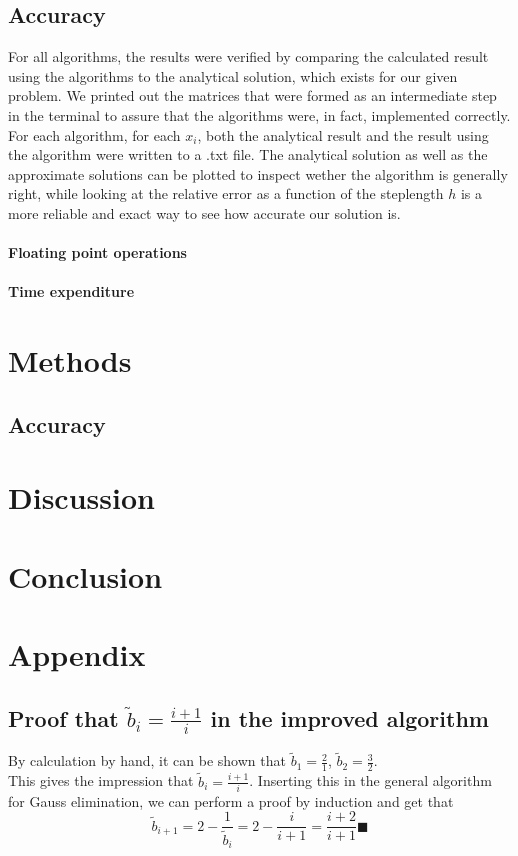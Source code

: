 \documentclass[10pt,a4paper]{article}
\begin{document}
\subsection{Accuracy}
For all algorithms, the results were verified by comparing the calculated result using the algorithms to the analytical solution, which exists for our given problem. We printed out the matrices that were formed as an intermediate step in the terminal to assure that the algorithms were, in fact, implemented correctly. For each algorithm, for each $x_i$, both the analytical result and the result using the algorithm were written to a .txt file. The analytical solution as well as the approximate solutions can be plotted to inspect wether the algorithm is generally right, while looking at the relative error as a function of the steplength $h$ is a more reliable and exact way to see how accurate our solution is. 
\paragraph{Floating point operations}

\paragraph{Time expenditure}


\section{Methods}
\subsection{Accuracy}

\section{Discussion}

\section{Conclusion}
\section{Appendix}
\subsection{Proof that $\tilde{b}_i=\frac{i+1}{i}$ in the improved algorithm}
By calculation by hand, it can be shown that  $\tilde{b}_1=\frac{2}{1}$,  $\tilde{b}_2=\frac{3}{2}$.\\
This gives the impression that  $\tilde{b}_i=\frac{i+1}{i}$.
Inserting this in the general algorithm for Gauss elimination, we can perform a proof by induction and get that
  $$\tilde{b}_{i+1}=2-\frac{1}{\tilde{b}_{i}}=2-\frac{i}{i+1}=\frac{i+2}{i+1} \blacksquare
$$
\end{document}
